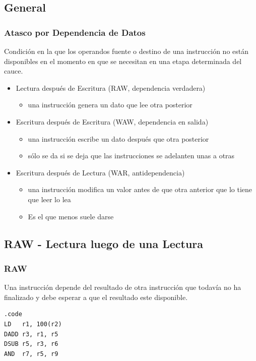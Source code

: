 \documentclass{beamer}
\begin{document}
\subsection{General}

\begin{frame}
\frametitle{Atasco por Dependencia de Datos}

Condición en la que los operandos fuente o destino de una instrucción no están disponibles en el momento en que se necesitan en una etapa determinada del cauce.
\begin{itemize}

\item Lectura después de Escritura (RAW, dependencia verdadera)
\begin{itemize}
\item  una instrucción genera un dato que lee otra posterior
\end{itemize}

\item Escritura después de Escritura (WAW, dependencia en salida)
\begin{itemize}
\item una instrucción escribe un dato después que otra posterior
\item sólo se da si se deja que las instrucciones se adelanten unas a otras
\end{itemize}

\item Escritura después de Lectura (WAR, antidependencia)
\begin{itemize}
\item una instrucción modifica un valor antes de que otra anterior que lo tiene que leer lo lea
\item Es el que menos suele darse
\end{itemize}
\end{itemize}
\end{frame}

\subsection{RAW - Lectura luego de una Lectura}
\begin{frame}[fragile]
\frametitle{RAW}
Una instrucción depende del resultado de otra instrucción que todavía no ha finalizado y debe esperar a que el resultado este disponible.
\begin{block}{}
\begin{lstlisting}[basicstyle=\ttfamily,keywordstyle=\color{blue}]
.code
LD   r1, 100(r2)
DADD r3, r1, r5
DSUB r5, r3, r6
AND  r7, r5, r9
\end{lstlisting}
\end{block}

\end{frame}
\end{document}
